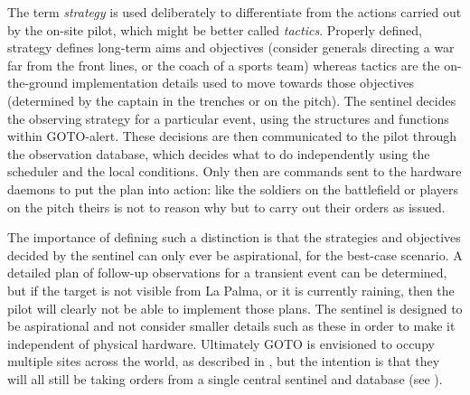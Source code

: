 \begin{colsection}
\begin{colsection}
The term \textit{strategy} is used deliberately to differentiate from the actions carried out by the on-site pilot, which might be better called \textit{tactics}. Properly defined, strategy defines long-term aims and objectives (consider generals directing a war far from the front lines, or the coach of a sports team) whereas tactics are the on-the-ground implementation details used to move towards those objectives (determined by the captain in the trenches or on the pitch). The sentinel decides the observing strategy for a particular event, using the structures and functions within GOTO-alert. These decisions are then communicated to the pilot through the observation database, which decides what to do independently using the scheduler and the local conditions. Only then are commands sent to the hardware daemons to put the plan into action: like the soldiers on the battlefield or players on the pitch theirs is not to reason why but to carry out their orders as issued.

The importance of defining such a distinction is that the strategies and objectives decided by the sentinel can only ever be aspirational, for the best-case scenario. A detailed plan of follow-up observations for a transient event can be determined, but if the target is not visible from La Palma, or it is currently raining, then the pilot will clearly not be able to implement those plans. The sentinel is designed to be aspirational and not consider smaller details such as these in order to make it independent of physical hardware. Ultimately GOTO is envisioned to occupy multiple sites across the world, as described in , but the intention is that they will all still be taking orders from a single central sentinel and database (see ).

\newpage


\end{colsection}
\end{colsection}
